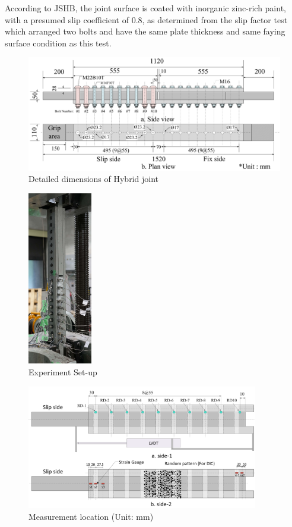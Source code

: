 According to JSHB\cite{douji2017}, the joint surface is coated with inorganic zinc-rich paint, with a presumed slip coefficient of 0.8, as determined from the slip factor test which arranged two bolts and have the same plate thickness and same faying surface condition as this test.

\begin{figure}
    \centering
    \includegraphics[width=\textwidth]{imgs/ch6/dimensions.pdf}
    \caption{Detailed dimensions of Hybrid joint}
    \label{fig-dimens}
\end{figure}

\begin{figure}[htbp]
    \centering
    \includegraphics[width=0.25\textwidth]{imgs/ch6/set-up.jpg}
    \caption{Experiment Set-up}
    \label{fig-setup}
\end{figure}

\begin{figure}
    \centering
    \includegraphics[width=0.9\textwidth]{imgs/ch6/mealoc.pdf}
    \caption{Measurement location (Unit: mm)}
    \label{fig-mealoc}
\end{figure}

